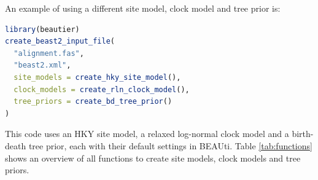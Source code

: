 \documentclass{article}
\begin{document}
An example of using a different site model, clock model 
and tree prior is:

\begin{lstlisting}[language=R, caption=Example with different site model and clock model and tree prior, label=lst:all_different, floatplacement=H]
library(beautier)
create_beast2_input_file(
  "alignment.fas",
  "beast2.xml",
  site_models = create_hky_site_model(),
  clock_models = create_rln_clock_model(),
  tree_priors = create_bd_tree_prior()
)
\end{lstlisting}

This code uses an HKY site model, a relaxed log-normal clock model and a 
birth-death tree prior, each with their default settings in BEAUti.
Table \ref{tab:functions} shows an overview of all functions to create site models, clock models and tree priors.
\end{document}
